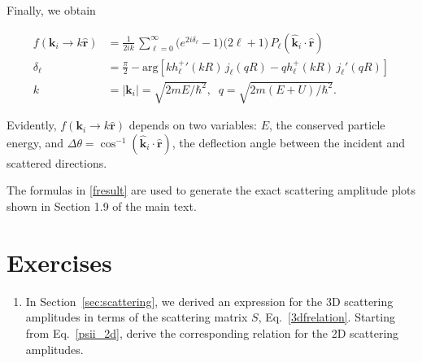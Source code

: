 \documentclass[pra,12pt]{revtex4-2}
\begin{document}
Finally, we obtain
\begin{framed}
\begin{equation}
  \begin{aligned}f(\mathbf{k}_i \rightarrow k\hat{\mathbf{r}}) &= \frac{1}{2ik}\, \sum_{\ell =0}^\infty \big(e^{2i\delta_\ell} - 1\big) \big(2\ell+1\big)\, P_{\ell}(\hat{\mathbf{k}}_i\cdot \hat{\mathbf{r}}) \\ \delta_\ell &= \frac{\pi}{2} - \mathrm{arg}\!\left[k{h_\ell^+}'(kR) \, j_\ell(qR) - qh_\ell^+(kR)\, j_\ell'(qR)\right] \\ k &= |\mathbf{k}_i| = \sqrt{2mE/\hbar^2}, \;\; q = \sqrt{2m(E+U)/\hbar^2}.\end{aligned}
  \label{fresult}
\end{equation}
\end{framed}
\noindent
Evidently, $f(\mathbf{k}_i \rightarrow k\hat{\mathbf{r}})$ depends on
two variables: $E$, the conserved particle energy, and $\Delta \theta
= \cos^{-1}(\hat{\mathbf{k}}_i\cdot \hat{\mathbf{r}})$, the deflection
angle between the incident and scattered directions.

The formulas in \eqref{fresult} are used to generate the exact
scattering amplitude plots shown in Section 1.9 of the main text.


\section*{Exercises}

\begin{enumerate}
\item \label{ex:2dscattering} In Section~\ref{sec:scattering}, we
  derived an expression for the 3D scattering amplitudes in terms of
  the scattering matrix $S$, Eq.~\eqref{3dfrelation}.  Starting from
  Eq.~\eqref{psii_2d}, derive the corresponding relation for the 2D
  scattering amplitudes.

\end{enumerate}
\end{document}
